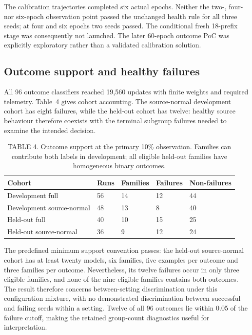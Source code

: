 The calibration trajectories completed six actual epochs. Neither the two-, four- nor six-epoch observation point passed the unchanged health rule for all three seeds; at four and six epochs two seeds passed. The conditional fresh 18-prefix stage was consequently not launched. The later 60-epoch outcome PoC was explicitly exploratory rather than a validated calibration solution.

\subsection{Outcome support and healthy failures}
All 96 outcome classifiers reached 19,560 updates with finite weights and required telemetry. Table~4 gives cohort accounting. The source-normal development cohort has eight failures, while the held-out cohort has twelve: healthy source behaviour therefore coexists with the terminal subgroup failures needed to examine the intended decision.

\begin{table}[t]
\caption{TABLE 4. Outcome support at the primary 10\% observation. Families can contribute both labels in development; all eligible held-out families have homogeneous binary outcomes.}
\label{tab:support}
\centering\small
\setlength{\tabcolsep}{3pt}
\begin{tabular}{lllll}
\toprule Cohort & Runs & Families & Failures & Non-failures\\\midrule
Development full &56&14&12&44\\
Development source-normal &48&13&8&40\\
Held-out full &40&10&15&25\\
Held-out source-normal &36&9&12&24\\\bottomrule
\end{tabular}
\end{table}

The predefined minimum support convention passes: the held-out source-normal cohort has at least twenty models, six families, five examples per outcome and three families per outcome. Nevertheless, its twelve failures occur in only three eligible families, and none of the nine eligible families contains both outcomes. The result therefore concerns between-setting discrimination under this configuration mixture, with no demonstrated discrimination between successful and failing seeds within a setting. Twelve of all 96 outcomes lie within 0.05 of the failure cutoff, making the retained group-count diagnostics useful for interpretation.

